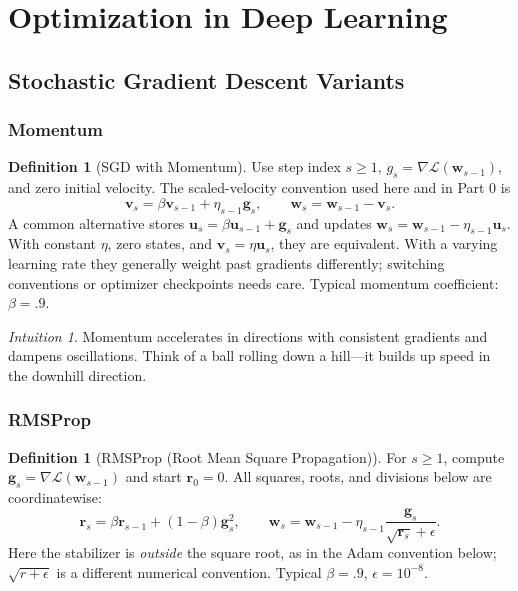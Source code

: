 \documentclass[11pt,twoside]{article}
\numberwithin{equation}{section}
\newcommand{\vect}[1]{\bm{#1}}
\newcommand{\Loss}{\mathcal{L}}
\theoremstyle{plain}
\theoremstyle{definition}
\newtheorem{definition}[theorem]{Definition}
\theoremstyle{remark}
\newtheorem{intuition}[theorem]{Intuition}
\begin{document}
\section{Optimization in Deep Learning}
\label{sec:optimizers}

\subsection{Stochastic Gradient Descent Variants}

\subsubsection{Momentum}

\begin{definition}[SGD with Momentum]
Use step index $s\ge1$, $g_s=\nabla\Loss(\vect w_{s-1})$, and zero initial
velocity. The scaled-velocity convention used here and in Part 0 is
\[
\vect v_s=\beta\vect v_{s-1}+\eta_{s-1}\vect g_s,\qquad
\vect w_s=\vect w_{s-1}-\vect v_s.
\]
A common alternative stores $\vect u_s=\beta\vect u_{s-1}+\vect g_s$
and updates $\vect w_s=\vect w_{s-1}-\eta_{s-1}\vect u_s$.
With constant $\eta$, zero states, and $\vect v_s=\eta\vect u_s$, they are
equivalent. With a varying learning rate they generally weight past gradients
differently; switching conventions or optimizer checkpoints needs care.
Typical momentum coefficient: $\beta=.9$.
\end{definition}

\begin{intuition}
Momentum accelerates in directions with consistent gradients and dampens oscillations. Think of a ball rolling down a hill---it builds up speed in the downhill direction.
\end{intuition}

\subsubsection{RMSProp}

\begin{definition}[RMSProp (Root Mean Square Propagation)]
For $s\ge1$, compute $\vect g_s=\nabla\Loss(\vect w_{s-1})$ and start
$\vect r_0=0$. All squares, roots, and divisions below are coordinatewise:
\[
\vect r_s=\beta\vect r_{s-1}+(1-\beta)\vect g_s^2,\qquad
\vect w_s=\vect w_{s-1}
 -\eta_{s-1}\frac{\vect g_s}{\sqrt{\vect r_s}+\epsilon}.
\]
Here the stabilizer is \emph{outside} the square root, as in the Adam convention
below; $\sqrt{r+\epsilon}$ is a different numerical convention. Typical
$\beta=.9$, $\epsilon=10^{-8}$.
\end{definition}
\end{document}
